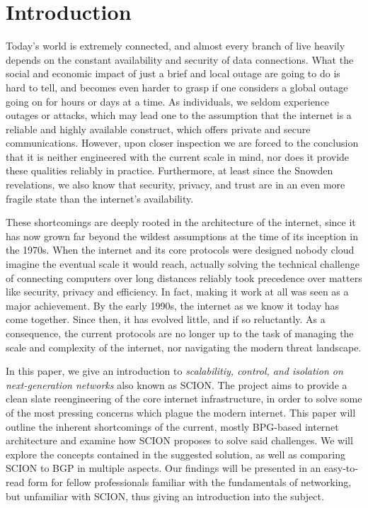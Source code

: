 \documentclass[../eva1_scion.tex]{subfiles}
\begin{document}
\section{Introduction}\label{sec:introduction}

    Today's world is extremely connected, and almost every branch of live heavily depends on the constant availability and security of data connections. What the social and economic impact of just a brief and local outage are going to do is hard to tell, and becomes even harder to grasp if one considers a global outage going on for hours or days at a time. As individuals, we seldom experience outages or attacks, which may lead one to the assumption that the internet is a reliable and highly available construct, which offers private and secure communications. However, upon closer inspection we are forced to the conclusion that it is neither engineered with the current scale in mind, nor does it provide these qualities reliably in practice. Furthermore, at least since the Snowden revelations, we also know that security, privacy, and trust are in an even more fragile state than the internet's availability.

    These shortcomings are deeply rooted in the architecture of the internet, since it has now grown far beyond the wildest assumptions at the time of its inception in the 1970s. When the internet and its core protocols were designed nobody cloud imagine the eventual scale it would reach, actually solving the technical challenge of connecting computers over long distances reliably took precedence over matters like security, privacy and efficiency. In fact, making it work at all was seen as a major achievement. By the early 1990s, the internet as we know it today has come together. Since then, it has evolved little, and if so reluctantly. As a consequence, the current protocols are no longer up to the task of managing the scale and complexity of the internet, nor navigating the modern threat landscape.

    In this paper, we give an introduction to \textit{scalabilitiy, control, and isolation on next-generation networks} also known as SCION. The project  aims to provide a clean slate reengineering of the core internet infrastructure, in order to solve some of the most pressing concerns which plague the modern internet. This paper will outline the inherent shortcomings of the current, mostly BPG-based internet architecture and examine how SCION proposes to solve said challenges. We will explore the concepts contained in the suggested solution, as well as comparing SCION to  BGP in multiple aspects. Our findings will be presented in an easy-to-read form for fellow professionals familiar with the fundamentals of networking, but unfamiliar with SCION, thus giving an introduction into the subject.
\end{document}
